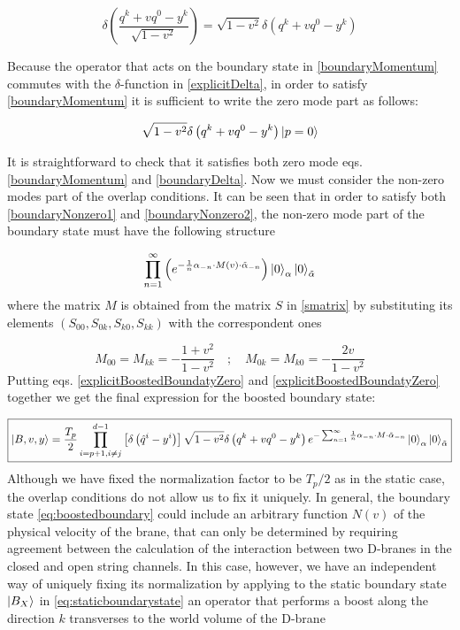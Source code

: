 \begin{equation}
\delta\left(\frac{q^k+vq^0-y^k}{\sqrt{1-v^2}}\right) = \sqrt{1-v^2}\delta\left(q^k+vq^0-y^k\right)
\label{explicitDelta}
\end{equation}

Because the operator that acts on the boundary state in \eqref{boundaryMomentum} commutes with the $\delta$-function in \eqref{explicitDelta}, in order to satisfy \eqref{boundaryMomentum} it is sufficient to write the zero mode part as follows:

\begin{equation}
\sqrt{1-v^2}\delta\left(q^k+vq^0-y^k\right)\ket{p=0}
\label{explicitBoostedBoundatyZero}
\end{equation}

It is straightforward to check that it satisfies both zero mode eqs. \eqref{boundaryMomentum} and \eqref{boundaryDelta}. Now we must consider the non-zero modes part of the overlap conditions. It can be seen that in order to satisfy both \eqref{boundaryNonzero1} and \eqref{boundaryNonzero2}, the non-zero mode part of the boundary state must have the following structure

\begin{equation}
\prod_{n=1}^{\infty}\left(e^{-\frac{1}{n}\alpha_{-n}\cdot M(v)\cdot\tilde{\alpha}_{-n}}\right)\ket{0}_\alpha\ket{0}_{\tilde{\alpha}}
\label{explicitBoostedBoundatyNonZero}
\end{equation}
where the matrix $M$ is obtained from the matrix $S$ in \eqref{smatrix} by substituting its elements $\left(S_{00},S_{0k},S_{k0},S_{kk}\right)$ with the correspondent ones

\begin{equation}
M_{00}=M_{kk} = -\frac{1+v^2}{1-v^2}\quad ; \quad M_{0k}=M_{k0}= -\frac{2v}{1-v^2}
\end{equation}
Putting eqs. \eqref{explicitBoostedBoundatyZero} and \eqref{explicitBoostedBoundatyZero} together we get the final expression for the boosted boundary state:

\begin{multline}
\boxed{\ket{B,v,y} = \frac{T_p}{2}\prod_{i=p+1,i\neq j}^{d-1}\left[\delta\left(\hat{q}^i-y^i\right)\right]\sqrt{1-v^2}\delta\left(q^k+vq^0-y^k\right)
e^{-\sum_{n=1}^\infty{\frac{1}{n}\alpha_{-n}\cdot M\cdot\tilde{\alpha}_{-n}}}\ket{0}_\alpha\ket{0}_{\tilde{\alpha}}
}
\label{eq:boostedboundary}
\end{multline}
Although we have fixed the normalization factor to be $T_p/2$ as in the static case, the overlap conditions do not allow us to fix it uniquely. In general, the boundary state \eqref{eq:boostedboundary} could include an arbitrary function $N(v)$ of the physical velocity of the brane, that can only be determined by requiring agreement between the calculation of the interaction between two D-branes in the closed and open string channels. In this case, however, we have an independent way of uniquely fixing its normalization by applying to the static boundary state $\ket{B_X}$ in \eqref{eq:staticboundarystate} an operator that performs a boost along the direction $k$ transverses to the world volume of the D-brane

